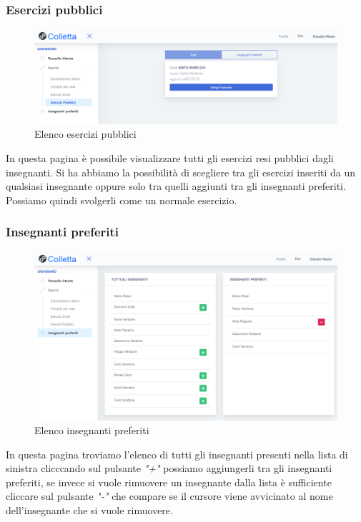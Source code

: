           
           \subsubsection{Esercizi pubblici}
        	\begin{figure}[H]
            	\centering
            	\includegraphics[width=17cm]{sez/img/studente/esercizipubblici.PNG} 
            	\caption{Elenco esercizi pubblici}\label{fig:1}
        	\end{figure}
        	In questa pagina è possibile visualizzare tutti gli esercizi resi pubblici dagli insegnanti. Si ha abbiamo la possibilità  di scegliere tra gli esercizi inseriti da un qualsiasi insegnante oppure solo tra quelli aggiunti tra gli insegnanti preferiti. Possiamo quindi svolgerli come un normale esercizio. 
        
        
        
\subsubsection{Insegnanti preferiti}
        	\begin{figure}[H]
            	\centering
            	\includegraphics[width=17cm]{sez/img/studente/insegnantepreferito.png} 
            	\caption{Elenco insegnanti preferiti}\label{fig:1}
        	\end{figure}        
        In questa pagina troviamo l'elenco di tutti gli insegnanti presenti nella lista di sinistra clicccando sul pulsante \textit{"+"} possiamo aggiungerli tra gli insegnanti preferiti, se invece si vuole rimuovere un insegnante dalla lista è sufficiente cliccare sul pulsante \textit{"-"} che compare se il cursore viene avvicinato al nome dell'insegnante che si vuole rimuovere.
        
